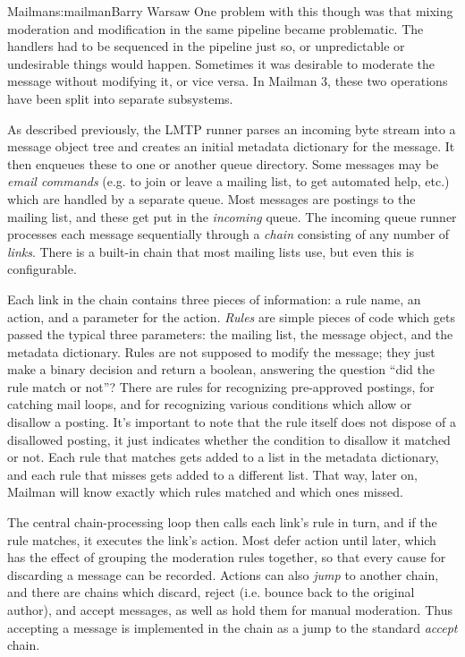 \begin{aosachapter}{Mailman}{s:mailman}{Barry Warsaw}
One problem with this though was that mixing moderation and modification in
the same pipeline became problematic.  The handlers had to be sequenced in the
pipeline just so, or unpredictable or undesirable things would happen.
Sometimes it was desirable to moderate the message without modifying it, or
vice versa.  In Mailman 3, these two operations have been split into separate
subsystems.

As described previously, the LMTP runner parses an incoming byte stream into a
message object tree and creates an initial metadata dictionary for the
message.  It then enqueues these to one or another queue directory.  Some
messages may be \emph{email commands} (e.g. to join or leave a mailing list, to get
automated help, etc.)  which are handled by a separate queue.  Most messages
are postings to the mailing list, and these get put in the \emph{incoming} queue.
The incoming queue runner processes each message sequentially through a
\emph{chain} consisting of any number of \emph{links}.  There is a built-in chain that
most mailing lists use, but even this is configurable.

Each link in the chain contains three pieces of information: a rule name, an
action, and a parameter for the action.  \emph{Rules} are simple pieces of code
which gets passed the typical three parameters: the mailing list, the message
object, and the metadata dictionary.  Rules are not supposed to modify the
message; they just make a binary decision and return a boolean, answering the
question ``did the rule match or not''?  There are rules for recognizing
pre-approved postings, for catching mail loops, and for recognizing various
conditions which allow or disallow a posting.  It's important to note that the
rule itself does not dispose of a disallowed posting, it just indicates
whether the condition to disallow it matched or not.  Each rule that matches
gets added to a list in the metadata dictionary, and each rule that misses
gets added to a different list.  That way, later on, Mailman will know exactly
which rules matched and which ones missed.

The central chain-processing loop then calls each link's rule in turn, and if
the rule matches, it executes the link's action.  Most defer action until
later, which has the effect of grouping the moderation rules together, so that
every cause for discarding a message can be recorded.  Actions can also \emph{jump}
to another chain, and there are chains which discard, reject (i.e. bounce back
to the original author), and accept messages, as well as hold them for manual
moderation.  Thus accepting a message is implemented in the chain as a jump to
the standard \emph{accept} chain.


\end{aosachapter}
